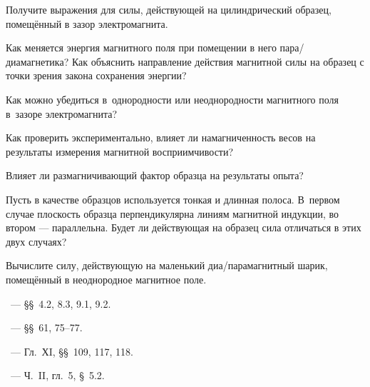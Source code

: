 \begin{lab:questions}
	\item Получите выражения для силы, действующей на цилиндрический образец,
помещённый в зазор электромагнита.
    \item Как меняется энергия магнитного поля при помещении в него
пара/диамагнетика? Как объяснить направление действия магнитной силы
на образец с точки зрения закона сохранения энергии?
    \item Как можно убедиться в~однородности или неоднородности магнитного поля
в~зазоре электромагнита?
	\item Как проверить экспериментально, влияет ли намагниченность весов на
результаты измерения магнитной восприимчивости?
    \item Влияет ли размагничивающий фактор образца на результаты опыта?
	\item Пусть в качестве образцов используется тонкая и длинная полоса.
    В~первом случае плоскость образца перпендикулярна линиям магнитной индукции,
    во втором --- параллельна. Будет ли действующая на образец сила
    отличаться в этих двух случаях?
    \item Вычислите силу, действующую на маленький диа/парамагнитный шарик,
    помещённый в неоднородное магнитное поле.
\end{lab:questions}


\begin{lab:literature}
    \item \Kirichenko~--- \S\S~4.2, 8.3, 9.1, 9.2.
	\item \SivuhinIII~--- \S\S~61, 75--77.
	\item \Kalashnikov~--- Гл.~ХI, \S\S~109, 117, 118.
	\item \KingLokOlh~--- Ч.~II, гл.~5, \S~5.2.
\end{lab:literature}

